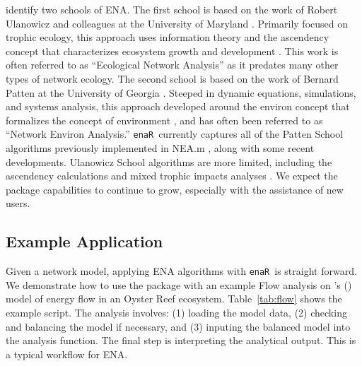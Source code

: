 \documentclass[11pt]{article}
\def\citeapos#1{\citeauthor{#1}'s (\citeyear{#1})}
\newcommand{\enaR}{\texttt{enaR}}
\begin{document}
\begin{spacing}{2}
\citet{scharler09comparing} identify two schools of ENA.  The first
school is based on the work of Robert Ulanowicz and colleagues at the
University of Maryland \citep{ulanowicz86, ulanowicz97,
  ulanowicz09_window}.  Primarily focused on trophic ecology, this
approach uses information theory and the ascendency concept that
characterizes ecosystem growth and development \citet{ulanowicz86,
  ulanowicz97}.  This work is often referred to as ``Ecological
Network Analysis'' as it predates many other types of network ecology.
The second school is based on the work of Bernard Patten at the
University of Georgia \citep{patten76, matis81, patten82,
  fath99_review}.  Steeped in dynamic equations, simulations, and
systems analysis, this approach developed around the environ concept
that formalizes the concept of environment \citep{patten78}, and has
often been referred to as ``Network Environ Analysis.''  \enaR\
currently captures all of the Patten School algorithms previously
implemented in NEA.m \citep{fath06}, along with some recent
developments.  Ulanowicz School algorithms are more limited, including
the ascendency calculations \citep{ulanowicz97} and mixed trophic
impacts analyses \citep{ulanowicz90}.  We expect the package
capabilities to continue to grow, especially with the assistance of
new users.

\subsection{Example Application}
Given a network model, applying ENA algorithms with \enaR\ is straight
forward. We demonstrate how to use the package with an example Flow
analysis on \citeapos{dame81} model of energy flow in an Oyster Reef
ecosystem. Table~\ref{tab:flow} shows the example script.  The
analysis involves: (1) loading the model data, (2) checking and
balancing the model if necessary, and (3) inputing the balanced model
into the analysis function.  The final step is interpreting the
analytical output. This is a typical workflow for ENA.


\end{spacing}
\end{document}

